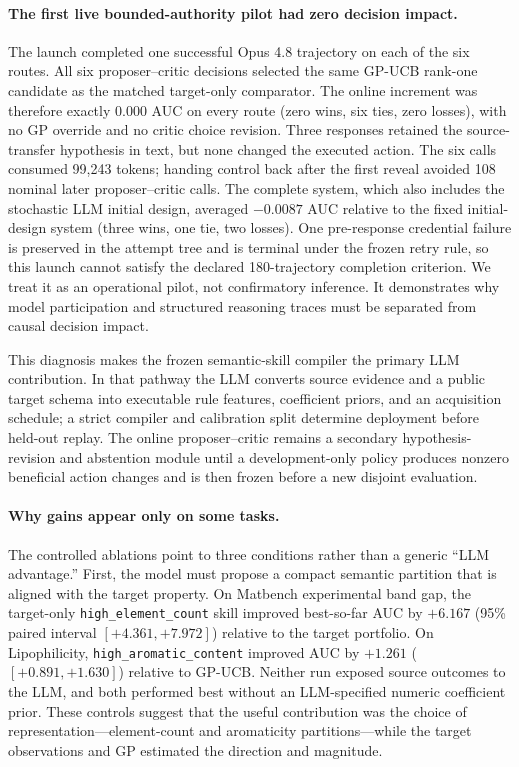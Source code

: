 \paragraph{The first live bounded-authority pilot had zero decision impact.}
The launch completed one successful Opus 4.8 trajectory on each of the six
routes. All six proposer--critic decisions selected the same GP-UCB rank-one
candidate as the matched target-only comparator. The online increment was
therefore exactly $0.000$ AUC on every route (zero wins, six ties, zero losses),
with no GP override and no critic choice revision. Three responses retained
the source-transfer hypothesis in text, but none changed the executed action.
The six calls consumed 99,243 tokens; handing control back after the first
reveal avoided 108 nominal later proposer--critic calls. The complete system,
which also includes the stochastic LLM initial design, averaged $-0.0087$ AUC
relative to the fixed initial-design system (three wins, one tie, two losses).
One pre-response credential failure is preserved in the attempt tree and is
terminal under the frozen retry rule, so this launch cannot satisfy the
declared 180-trajectory completion criterion. We treat it as an operational
pilot, not confirmatory inference. It demonstrates why model participation and
structured reasoning traces must be separated from causal decision impact.

This diagnosis makes the frozen semantic-skill compiler the primary LLM
contribution. In that pathway the LLM converts source evidence and a public
target schema into executable rule features, coefficient priors, and an
acquisition schedule; a strict compiler and calibration split determine
deployment before held-out replay. The online proposer--critic remains a
secondary hypothesis-revision and abstention module until a development-only
policy produces nonzero beneficial action changes and is then frozen before a
new disjoint evaluation.

\paragraph{Why gains appear only on some tasks.}
The controlled ablations point to three conditions rather than a generic
``LLM advantage.'' First, the model must propose a compact semantic partition
that is aligned with the target property. On Matbench experimental band gap,
the target-only \texttt{high\_element\_count} skill improved best-so-far AUC by
$+6.167$ (95\% paired interval $[+4.361,+7.972]$) relative to the target
portfolio. On Lipophilicity, \texttt{high\_aromatic\_content} improved AUC by
$+1.261$ ($[+0.891,+1.630]$) relative to GP-UCB. Neither run exposed source
outcomes to the LLM, and both performed best without an LLM-specified numeric
coefficient prior. These controls suggest that the useful contribution was the
choice of representation---element-count and aromaticity partitions---while
the target observations and GP estimated the direction and magnitude.

